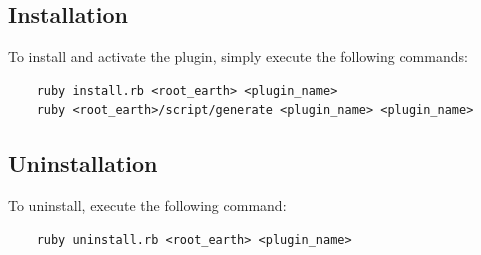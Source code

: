 \documentclass{article}
\begin{document}

\subsection{Installation} %

\noindent
To install and activate the plugin, simply execute the following commands: 

\begin{verbatim}
    ruby install.rb <root_earth> <plugin_name>
    ruby <root_earth>/script/generate <plugin_name> <plugin_name>
\end{verbatim}


\subsection{Uninstallation} %

To uninstall, execute the following command:

\begin{verbatim}
    ruby uninstall.rb <root_earth> <plugin_name>
\end{verbatim}

\end{document}
